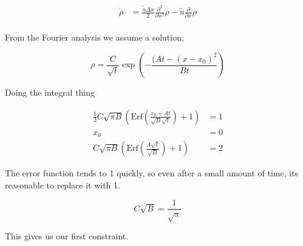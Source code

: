 \documentclass[a4paper]{article}
\begin{document}
\begin{align*}
\dot{\rho} & = \frac{\tilde{u} \Delta x}{2} \frac{\partial ^2}{\partial x ^2} \rho - \tilde{u} \frac{\partial}{\partial x} \rho \\
\end{align*}

From the Fourier analysis we assume a solution; 

\begin{equation}
\rho = \frac{C}{\sqrt{t}} \exp \left( - \frac{(At - (x-x_0)^2}{Bt} \right)
\end{equation}

Doing the integral thing 

\begin{align*}
\frac{1}{2} C \sqrt{\pi B} \left( \text{Erf} \left( \frac{x_0 + At}{\sqrt{B} \sqrt{t}} \right) + 1 \right) & = 1 \\ 
x_0 & = 0 \\
C \sqrt{\pi B} \left( \text{Erf} \left( \frac{A \sqrt{t}}{\sqrt{B}} \right) + 1 \right) & = 2
\end{align*}

The error function tends to 1 quickly, so even after a small amount of time, its reasonable to replace it with 1. 

\begin{equation}
C \sqrt{B} = \frac{1}{\sqrt{\pi}}
\end{equation}

This gives us our first constraint. 
\end{document}
